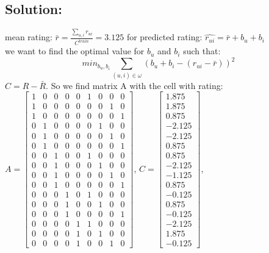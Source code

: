 \documentclass{article}
\begin{document}
{{\subsection*{Solution:}
\Large mean rating: $\bar{r} = \frac{\sum_{u,i}r_{ui}}{C^{train}} = 3.125$ \hspace{\fill}
for predicted rating: $\hat{r_{ui}} = \bar{r}+b_u+b_i$ \\
we want to find the optimal value for $b_u$ and $b_i$ such that: $$min_{b_u,b_i}\sum_{(u,i)\in \omega}(b_u+b_i-(r_{ui}-\bar{r}))^2$$
$C=R-\bar{R}$. So we find matrix A with the cell with rating: \\
$ A = \begin{bmatrix}
1&0&0&0&0&1&0&0&0\\
1&0&0&0&0&0&0&1&0\\
1&0&0&0&0&0&0&0&1\\
0&1&0&0&0&0&1&0&0\\
0&1&0&0&0&0&0&1&0\\
0&1&0&0&0&0&0&0&1\\
0&0&1&0&0&1&0&0&0\\
0&0&1&0&0&0&1&0&0\\
0&0&1&0&0&0&0&1&0\\
0&0&1&0&0&0&0&0&1\\
0&0&0&1&0&1&0&0&0\\
0&0&0&1&0&0&1&0&0\\
0&0&0&1&0&0&0&0&1\\
0&0&0&0&1&1&0&0&0\\
0&0&0&0&1&0&1&0&0\\
0&0&0&0&1&0&0&1&0
\end{bmatrix} $,\hspace{20pt}
$ C = \begin{bmatrix}
1.875\\1.875\\0.875\\-2.125\\-2.125\\0.875\\0.875\\-2.125\\-1.125\\0.875\\-0.125\\0.875\\-0.125\\-2.125\\1.875\\-0.125
\end{bmatrix} $,\hspace{20pt}
}}
\end{document}
